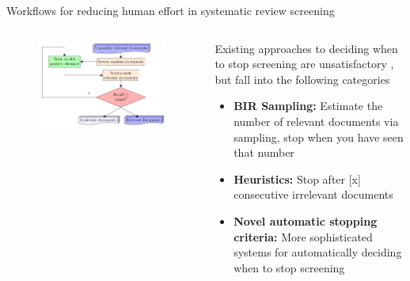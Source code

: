 \documentclass[9pt, aspectratio=169]{beamer}
\begin{document}
\begin{frame}{Workflows for reducing human effort in systematic review screening}

\begin{columns}
	\begin{column}{0.6\linewidth}
		\begin{figure}
			\includegraphics[width=\linewidth]{../images/flow_noeq_basic.pdf}
		\end{figure}
	\end{column}
	\begin{column}{0.4\linewidth}
		Existing approaches to deciding when to stop screening are unsatisfactory \cite{bannach-brown2019, Marshall2019}, but fall into the following categories
		
		\medskip
		
		\begin{itemize}
			\item \textbf{BIR Sampling:} Estimate the number of relevant documents via sampling, stop when you have seen that number \cite{Shemilt2014}
			\item \textbf{Heuristics:} Stop after [x] consecutive irrelevant documents \cite{Jonnalagadda2013, Przybya2018}
			\item \textbf{Novel automatic stopping criteria:} More sophisticated systems for automatically deciding when to stop screening \cite{Yu2019, DiNunzio2018, Howard2020}
		\end{itemize}
		
	\end{column}
\end{columns}

\end{frame}
\end{document}

